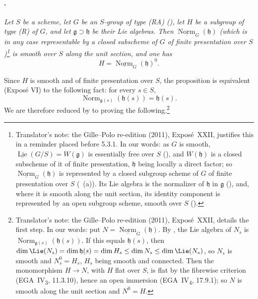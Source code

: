 \paragraph{.}
\textit{Let \(S\) be a scheme, let \(G\) be an \(S\)-group of type
\textup{(RA)} \textup{()}, let \(H\) be a subgroup of type
\textup{(R)} of \(G\), and let
\(\mathfrak g\supset\mathfrak h\) be their Lie algebras. Then
\(\underline{\operatorname{Norm}}_G(\mathfrak h)\)
\textup{(which is in any case representable by a closed subscheme of
\(G\) of finite presentation over \(S\))}\footnote{Translator's note: the Gille--Polo re-edition (2011), Exposé~XXII,
justifies this in a reminder placed before 5.3.1. In our words: as \(G\) is
smooth, \(\underline{\operatorname{Lie}}(G/S)=W(\mathfrak g)\) is essentially
free over \(S\) (), and \(W(\mathfrak h)\) is a closed subscheme of it
of finite presentation, \(\mathfrak h\) being locally a direct factor; so
\(\underline{\operatorname{Norm}}_G(\mathfrak h)\) is represented by a closed
subgroup scheme of \(G\) of finite presentation over \(S\)
(~(a)). Its Lie algebra is the normalizer of \(\mathfrak h\)
in \(\mathfrak g\) (), and, where it is smooth along the unit
section, its identity component is represented by an open subgroup scheme,
smooth over \(S\) ().} is smooth over \(S\) along
the unit section, and one has}
\[
  H=\underline{\operatorname{Norm}}_G(\mathfrak h)^0.
\]

Since \(H\) is smooth and of finite presentation over \(S\), the
proposition is equivalent \textup{(Exposé VI)} to the following fact:
for every \(s\in S\),
\[
  \operatorname{Norm}_{\mathfrak g(s)}(\mathfrak h(s))
  =
  \mathfrak h(s).
\]
We are therefore reduced by  to proving the following.\footnote{Translator's note: the Gille--Polo re-edition (2011), Exposé~XXII,
details the first step. In our words: put \(N=\underline{\operatorname{Norm}}_G(\mathfrak h)\).
By , the Lie algebra of \(N_s\) is
\(\operatorname{Norm}_{\mathfrak g(s)}(\mathfrak h(s))\). If this equals
\(\mathfrak h(s)\), then
\(\dim\Lie(N_s)=\dim\mathfrak h(s)=\dim H_s\leq\dim N_s\leq\dim\Lie(N_s)\),
so \(N_s\) is smooth and \(N_s^0=H_s\), \(H_s\) being smooth and connected.
Then the monomorphism \(H\to N\), with \(H\) flat over \(S\), is flat by the
fibrewise criterion (EGA~IV\textsubscript{3}, 11.3.10), hence an open
immersion (EGA~IV\textsubscript{4}, 17.9.1); so \(N\) is smooth along the
unit section and \(N^0=H\).}

